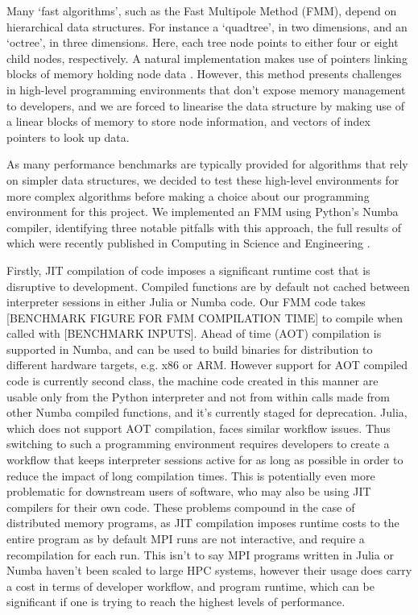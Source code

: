 Many `fast algorithms', such as the Fast Multipole Method (FMM), depend on hierarchical data structures. For instance a `quadtree', in two dimensions, and an `octree', in three dimensions. Here, each tree node points to either four or eight child nodes, respectively. A natural implementation makes use of pointers linking blocks of memory holding node data \cite{sundar2008bottom}. However, this method presents challenges in high-level programming environments that don't expose memory management to developers, and we are forced to linearise the data structure by making use of a linear blocks of memory to store node information, and vectors of index pointers to look up data.

As many performance benchmarks are typically provided for algorithms that rely on simpler data structures, we decided to test these high-level environments for more complex algorithms before making a choice about our programming environment for this project. We implemented an FMM using Python's Numba compiler, identifying three notable pitfalls with this approach, the full results of which were recently published in Computing in Science and Engineering \cite{kailasa2022pyexafmm}.

Firstly, JIT compilation of code imposes a significant runtime cost that is disruptive to development. Compiled functions are by default not cached between interpreter sessions in either Julia or Numba code. Our FMM code takes [BENCHMARK FIGURE FOR FMM COMPILATION TIME] to compile when called with [BENCHMARK INPUTS]. Ahead of time (AOT) compilation is supported in Numba, and can be used to build binaries for distribution to different hardware targets, e.g. x86 or ARM. However support for AOT compiled code is currently second class, the machine code created in this manner are usable only from the Python interpreter and not from within calls made from other Numba compiled functions, and it's currently staged for deprecation. Julia, which does not support AOT compilation, faces similar workflow issues. Thus switching to such a programming environment requires developers to create a workflow that keeps interpreter sessions active for as long as possible in order to reduce the impact of long compilation times. This is potentially even more problematic for downstream users of software, who may also be using JIT compilers for their own code. These problems compound in the case of distributed memory programs, as JIT compilation imposes runtime costs to the entire program as by default MPI runs are not interactive, and require a recompilation for each run. This isn't to say MPI programs written in Julia or Numba haven't been scaled to large HPC systems, however their usage does carry a cost in terms of developer workflow, and program runtime, which can be significant if one is trying to reach the highest levels of performance.


